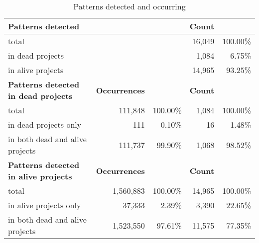 \begin{table}[H]
\caption{Patterns detected and occurring}\label{table:pattern_counts}
\centering
\begin{tabular}{lrr|rr}
\hline
	\bfseries{Patterns detected}\rm & & & \bfseries{Count} \\
	\hline
	total & & & 16,049 & 100.00\% \\
	\hline
	in dead projects & & & 1,084 & 6.75\% \\
	in alive projects & & & 14,965 & 93.25\% \\
\hline\hline
	\bfseries{Patterns detected in dead projects}\rm & \bfseries{Occurrences}\rm
	& & \bfseries{Count}\rm \\
	\hline
	total & 111,848 & 100.00\% & 1,084 & 100.00\% \\
	\hline
	in dead projects only & 111 & 0.10\% & 16 & 1.48\% \\
	in both dead and alive projects & 111,737 & 99.90\% & 1,068 & 98.52\% \\
\hline\hline
	\bfseries{Patterns detected in alive projects}\rm & \bfseries{Occurrences}\rm & & \bfseries{Count}\rm \\
	\hline
	total & 1,560,883 & 100.00\% & 14,965 & 100.00\% \\
	\hline
	in alive projects only & 37,333 & 2.39\% & 3,390 & 22.65\% \\
	in both dead and alive projects & 1,523,550 & 97.61\% & 11,575 & 77.35\% \\
\hline
\end{tabular}
\end{table}